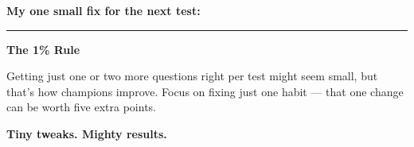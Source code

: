 {\begin{tcolorbox}[
    enhanced,
    colback=funGreenLight,
    colframe=funGreen!50,
    arc=10pt,
    boxrule=1.5pt,
    left=6mm, right=6mm, top=5mm, bottom=5mm,
]
\vspace{3mm}

\textbf{My one small fix for the next test:}

\vspace{1mm}

\rule[-2pt]{12cm}{0.5pt}
\end{tcolorbox}

\vspace{3mm}

\begin{tcolorbox}[
    enhanced,
    colback=funYellowLight,
    colframe=funYellow!60,
    arc=10pt,
    boxrule=1pt,
    left=6mm, right=6mm, top=4mm, bottom=4mm,
]
{\bfseries\color{funYellowDark} \faMagic\hspace{2mm}The 1\% Rule}

\vspace{2mm}

Getting just one or two more questions right per test might seem small, but that's how champions improve. Focus on fixing just one habit — that one change can be worth five extra points.
\end{tcolorbox}

\vspace{4mm}

\begin{center}
{\large\bfseries\color{funGreenDark} \faCog\hspace{2mm}Tiny tweaks. Mighty results.\hspace{2mm}\faCog}
\end{center}

}
\newpage
